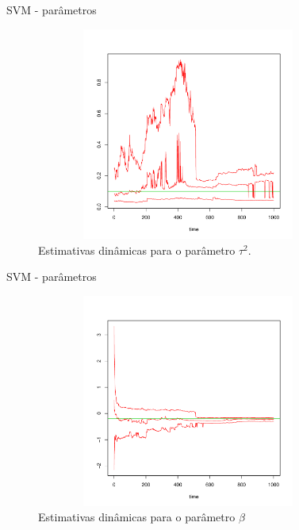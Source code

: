 \documentclass{beamer}
\begin{document}
 
 \begin{frame}{SVM - parâmetros}

 
 \begin{figure}
\begin{center}
 \includegraphics[height=7cm,width =10cm]{tau_1_01_02_05.pdf}
 \end{center}
\caption{ Estimativas dinâmicas para o parâmetro $\tau^2$.} 
\end{figure}

 \end{frame}
 



\begin{frame}{SVM - parâmetros}


 \begin{figure}
\begin{center}
 \includegraphics[height=7cm,width =10cm]{beta_1_01_02_05.pdf}
 \end{center}
\caption{Estimativas dinâmicas para o parâmetro $\beta$ } 
\end{figure}

 
 \end{frame}
 
\end{document}
